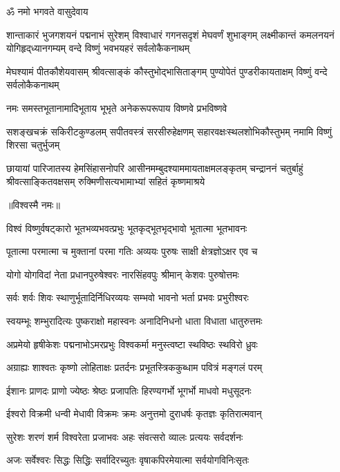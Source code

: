 \centerline{ॐ नमो भगवते वासुदेवाय}
\fourlineindentedshloka
{शान्ताकारं भुजगशयनं पद्मनाभं सुरेशम्}
{विश्वाधारं गगनसदृशं मेघवर्णं शुभाङ्गम्}
{लक्ष्मीकान्तं कमलनयनं योगिहृद्‌ध्यानगम्यम्}
{वन्दे विष्णुं भवभयहरं सर्वलोकैकनाथम्}

\fourlineindentedshloka
{मेघश्यामं पीतकौशेयवासम्}
{श्रीवत्साङ्कं कौस्तुभोद्भासिताङ्गम्}
{पुण्योपेतं पुण्डरीकायताक्षम्}
{विष्णुं वन्दे सर्वलोकैकनाथम्}

\twolineshloka
{नमः समस्तभूतानामादिभूताय भूभृते}
{अनेकरूपरूपाय विष्णवे प्रभविष्णवे}

\fourlineindentedshloka
{सशङ्खचक्रं सकिरीटकुण्डलम्}
{सपीतवस्त्रं सरसीरुहेक्षणम्}
{सहारवक्षःस्थलशोभिकौस्तुभम्}
{नमामि विष्णुं शिरसा चतुर्भुजम्}

\fourlineindentedshloka
{छायायां पारिजातस्य हेमसिंहासनोपरि}
{आसीनमम्बुदश्याममायताक्षमलङ्कृतम्}
{चन्द्राननं चतुर्बाहुं श्रीवत्साङ्कितवक्षसम्}
{रुक्मिणीसत्यभामाभ्यां सहितं कृष्णमाश्रये}

\nopagebreak[4]
\centerline{॥विश्वस्मै नमः॥}\nopagebreak[4]
\resetShloka
\twolineshloka
{विश्वं विष्णुर्वषट्कारो भूतभव्यभवत्प्रभुः}
{भूतकृद्भूतभृद्भावो भूतात्मा भूतभावनः}

\twolineshloka
{पूतात्मा परमात्मा च मुक्तानां परमा गतिः}
{अव्ययः पुरुषः साक्षी क्षेत्रज्ञोऽक्षर एव च}

\twolineshloka
{योगो योगविदां नेता प्रधानपुरुषेश्वरः}
{नारसिंहवपुः श्रीमान् केशवः पुरुषोत्तमः}

\twolineshloka
{सर्वः शर्वः शिवः स्थाणुर्भूतादिर्निधिरव्ययः}
{सम्भवो भावनो भर्ता प्रभवः प्रभुरीश्वरः}

\twolineshloka
{स्वयम्भूः शम्भुरादित्यः पुष्कराक्षो महास्वनः}
{अनादिनिधनो धाता विधाता धातुरुत्तमः}

\twolineshloka
{अप्रमेयो हृषीकेशः पद्मनाभोऽमरप्रभुः}
{विश्वकर्मा मनुस्त्वष्टा स्थविष्ठः स्थविरो ध्रुवः}

\twolineshloka
{अग्राह्यः शाश्वतः कृष्णो लोहिताक्षः प्रतर्दनः}
{प्रभूतस्त्रिककुब्धाम पवित्रं मङ्गलं परम्}

\twolineshloka
{ईशानः प्राणदः प्राणो ज्येष्ठः श्रेष्ठः प्रजापतिः}
{हिरण्यगर्भो भूगर्भो माधवो मधुसूदनः}

\twolineshloka
{ईश्वरो विक्रमी धन्वी मेधावी विक्रमः क्रमः}
{अनुत्तमो दुराधर्षः कृतज्ञः कृतिरात्मवान्}

\twolineshloka
{सुरेशः शरणं शर्म विश्वरेता प्रजाभवः}
{अहः संवत्सरो व्यालः प्रत्ययः सर्वदर्शनः}

\twolineshloka
{अजः सर्वेश्वरः सिद्धः सिद्धिः सर्वादिरच्युतः}
{वृषाकपिरमेयात्मा सर्वयोगविनिःसृतः}

